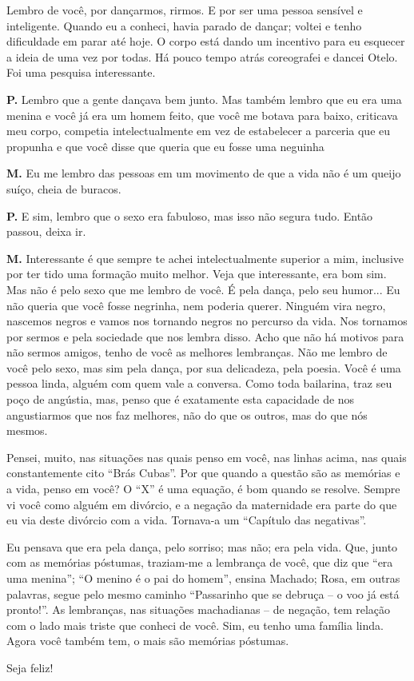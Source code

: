 {Lembro de você, por dançarmos, rirmos. E por ser uma pessoa sensível e
inteligente. Quando eu a conheci, havia parado de dançar; voltei e tenho
dificuldade em parar até hoje. O corpo está dando um incentivo para eu
esquecer a ideia de uma vez por todas. Há pouco tempo atrás coreografei
e dancei Otelo. Foi uma pesquisa interessante.

\textbf{P.} Lembro que a gente dançava bem junto. Mas também lembro que
eu era uma menina e você já era um homem feito, que você me botava para
baixo, criticava meu corpo, competia intelectualmente em vez de
estabelecer a parceria que eu propunha e que você disse que queria que
eu fosse uma neguinha

\textbf{M.} Eu me lembro das pessoas em um movimento de que a vida não é
um queijo suíço, cheia de buracos.

\textbf{P.} E sim, lembro que o sexo era fabuloso, mas isso não segura
tudo. Então passou, deixa ir.

\textbf{M.} Interessante é que sempre te achei intelectualmente superior
a mim, inclusive por ter tido uma formação muito melhor. Veja que
interessante, era bom sim. Mas não é pelo sexo que me lembro de você. É
pela dança, pelo seu humor... Eu não queria que você fosse negrinha, nem
poderia querer. Ninguém vira negro, nascemos negros e vamos nos tornando
negros no percurso da vida. Nos tornamos por sermos e pela sociedade que
nos lembra disso. Acho que não há motivos para não sermos amigos, tenho
de você as melhores lembranças. Não me lembro de você pelo sexo, mas sim
pela dança, por sua delicadeza, pela poesia. Você é uma pessoa linda,
alguém com quem vale a conversa. Como toda bailarina, traz seu poço de
angústia, mas, penso que é exatamente esta capacidade de nos
angustiarmos que nos faz melhores, não do que os outros, mas do que nós
mesmos.

Pensei, muito, nas situações nas quais penso em você, nas linhas acima,
nas quais constantemente cito ``Brás Cubas''. Por que quando a questão são
as memórias e a vida, penso em você? O ``X'' é uma equação, é bom quando
se resolve. Sempre vi você como alguém em divórcio, e a negação da
maternidade era parte do que eu via deste divórcio com a vida. Tornava-a
um ``Capítulo das negativas''.

Eu pensava que era pela dança, pelo sorriso; mas não; era pela vida.
Que, junto com as memórias póstumas, traziam-me a lembrança de você, que
diz que ``era uma menina''; ``O menino é o pai do homem'', ensina Machado;
Rosa, em outras palavras, segue pelo mesmo caminho ``Passarinho que se
debruça -- o voo já está pronto!''. As lembranças, nas situações
machadianas -- de negação, tem relação com o lado mais triste que conheci
de você. Sim, eu tenho uma família linda. Agora você também tem, o mais
são memórias póstumas.

Seja feliz!
}
